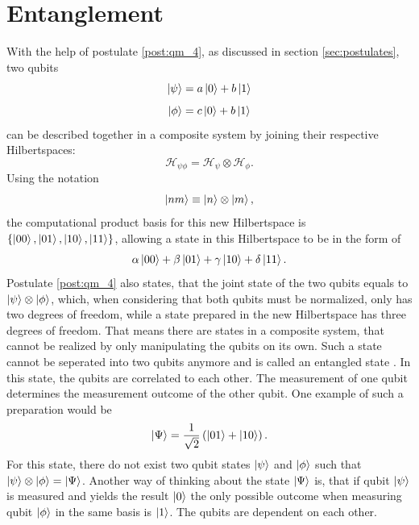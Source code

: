 \section{Entanglement} \label{sec:entanglement}
	With the help of postulate \ref{post:qm_4}, as discussed in section \ref{sec:postulates}, two qubits
	\begin{equation}
		\label{eq:qubit_psi}
		\ket{\psi}=a\ket{0}+b\ket{1}
	\end{equation}
	\begin{equation}
		\label{eq:qubit_phi}
		\ket{\phi}=c\ket{0}+b\ket{1}
	\end{equation}
	can be described together in a composite system by joining their respective Hilbertspaces:
	\begin{equation}
		\label{eq:qubit_composite_hilbertspace}
		\mathcal{H}_{\psi\phi}=\mathcal{H}_\psi\otimes\mathcal{H}_\phi.
	\end{equation}
	Using the notation
	\begin{equation}
		\ket{nm}\equiv\ket{n}\otimes\ket{m},
	\end{equation}
	the computational product basis for this new Hilbertspace is $\{\ket{00},\ket{01},\ket{10},\ket{11}\}$, allowing a state in this Hilbertspace to be in the form of
	\begin{equation}
		\label{eq:allowed_states_in_composite_two_qubits}
		\alpha\ket{00}+\beta\ket{01}+\gamma\ket{10}+\delta\ket{11}.
	\end{equation}
	Postulate \ref{post:qm_4} also states, that the joint state of the two qubits equals to $\ket{\psi}\otimes\ket{\phi}$, which, when considering that both qubits must be normalized, only has two degrees of freedom, while a state prepared in the new Hilbertspace has three degrees of freedom. That means there are states in a composite system, that cannot be realized by only manipulating the qubits on its own. Such a state cannot be seperated into two qubits anymore and is called an entangled state \cite{Nielsen2010-xd}. In this state, the qubits are correlated to each other. The measurement of one qubit determines the measurement outcome of the other qubit. One example of such a preparation would be 
	\begin{equation}
		\label{eq:two_qubit_entangled}
		\ket{\Psi}=\frac{1}{\sqrt{2}}\left(\ket{01}+\ket{10}\right).
	\end{equation}
	For this state, there do not exist two qubit states $\ket{\psi}$ and $\ket{\phi}$ such that $\ket{\psi}\otimes \ket{\phi}=\ket{\Psi}$. Another way of thinking about the state $\ket{\Psi}$ is, that if qubit $\ket{\psi}$ is measured and yields the result $\ket{0}$ the only possible outcome when measuring qubit $\ket{\phi}$ in the same basis is $\ket{1}$. The qubits are dependent on each other.